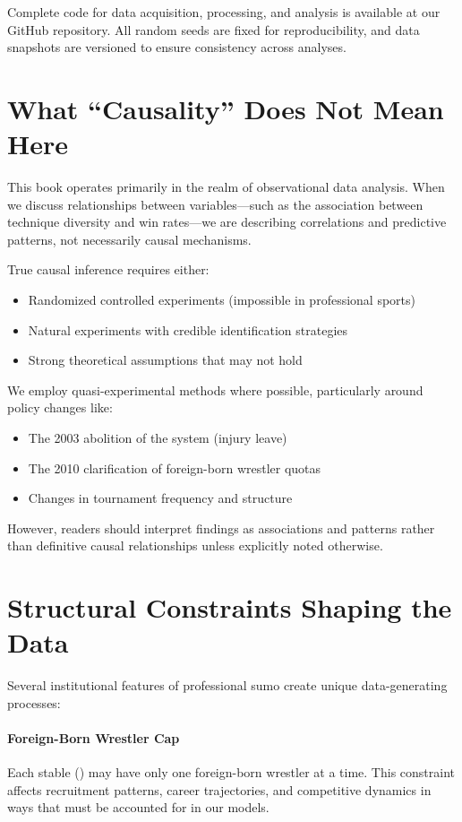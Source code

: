 Complete code for data acquisition, processing, and analysis is available at our GitHub repository. All random seeds are fixed for reproducibility, and data snapshots are versioned to ensure consistency across analyses.

\section*{What ``Causality'' Does Not Mean Here}

This book operates primarily in the realm of observational data analysis. When we discuss relationships between variables---such as the association between technique diversity and win rates---we are describing correlations and predictive patterns, not necessarily causal mechanisms.

True causal inference requires either:
\begin{itemize}
\item Randomized controlled experiments (impossible in professional sports)
\item Natural experiments with credible identification strategies
\item Strong theoretical assumptions that may not hold
\end{itemize}

We employ quasi-experimental methods where possible, particularly around policy changes like:
\begin{itemize}
\item The 2003 abolition of the  system (injury leave)
\item The 2010 clarification of foreign-born wrestler quotas
\item Changes in tournament frequency and structure
\end{itemize}

However, readers should interpret findings as associations and patterns rather than definitive causal relationships unless explicitly noted otherwise.

\section*{Structural Constraints Shaping the Data}

Several institutional features of professional sumo create unique data-generating processes:

\paragraph{Foreign-Born Wrestler Cap} Each stable () may have only one foreign-born wrestler at a time. This constraint affects recruitment patterns, career trajectories, and competitive dynamics in ways that must be accounted for in our models.

